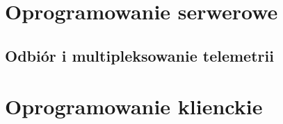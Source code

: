\section{Oprogramowanie serwerowe}

\subsection{Odbiór i multipleksowanie telemetrii}

\section{Oprogramowanie klienckie}



